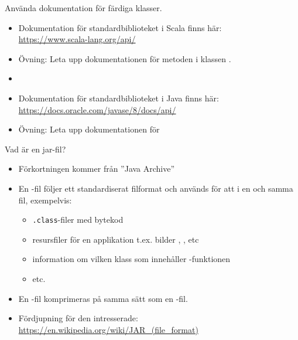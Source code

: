 \begin{Slide}{Använda dokumentation för färdiga klasser.}
\begin{itemize}
  \item Dokumentation för standardbiblioteket i Scala finns här:  \\ \url{https://www.scala-lang.org/api/}
  \item Övning: Leta upp dokumentationen för metoden  i klassen .
  \item[]
  \item Dokumentation för standardbiblioteket i Java finns här:  \\ \url{https://docs.oracle.com/javase/8/docs/api/}
  \item Övning: Leta upp dokumentationen för 

\end{itemize}
\end{Slide}


\begin{Slide}{Vad är en jar-fil?}
\begin{itemize}
  \item Förkortningen  kommer från ''Java Archive''
  \item En -fil följer ett standardiserat filformat och används för att  i en och samma fil, exempelvis:
  \begin{itemize}
    \item \texttt{.class}-filer med bytekod
    \item resursfiler för en applikation t.ex. bilder , , etc
    \item information om vilken klass som innehåller -funktionen
    \item etc.
  \end{itemize}
  \item En -fil komprimeras på samma sätt som en -fil.
  \item Fördjupning för den intresserade:\\
  {\SlideFontTiny\url{https://en.wikipedia.org/wiki/JAR_(file_format)}}
\end{itemize}
\end{Slide}


